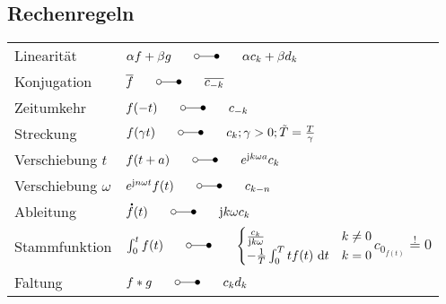 \documentclass[6pt,a4paper]{scrartcl}
\let\oldlaplace = \laplace
\renewcommand*{\dot}[1]{\accentset{\mbox{\textrm{\large\bfseries .}} }{#1}}
\renewcommand{\i}{\ensuremath{\mathrm{j}}}										%
\newcommand{\ol}[1]{\ensuremath{\overline{#1}}}									%
\newcommand{\diff}{\ensuremath{\ \mathrm d}}									%
\renewcommand{\laplace}{\ \; \oldlaplace \ \;}
\renewcommand{\fourier}{\laplace}
\begin{document}
\begin{multicols}{4}
	\subsection{Rechenregeln}
	\begin{tabularx}{\columnwidth}{lX}
		Linearität & $\alpha f + \beta g \fourier \alpha c_k + \beta d_k$\\
		Konjugation & $\ol{f} \fourier \ol{c_{-k}}$\\
		Zeitumkehr & $f(-t) \fourier c_{-k}$\\
		Streckung & $f(\gamma t) \fourier c_k; \gamma > 0; \tilde{T} = \frac{T}{\gamma}$\\
		Verschiebung $t$ & $f(t + a) \fourier e^{\i k \omega a} c_k$\\
		Verschiebung $\omega$ & $e^{\i n \omega t} f(t) \fourier c_{k - n}$\\
		Ableitung & $\dot{f}(t) \fourier \i k \omega c_k$\\
		Stammfunktion & $\int_0^t f(t) \fourier \begin{cases} \frac{c_k}{\i k \omega} & k \neq 0\\ -\frac{1}{T}\int_0^T t f(t) \diff t & k = 0\\ \end{cases}$\linebreak $c_{0_{f(t)}} \stackrel{!}{=} 0$\\
		Faltung & $f * g \fourier c_k d_k$\\
	\end{tabularx}
	

\end{multicols}
\end{document}
